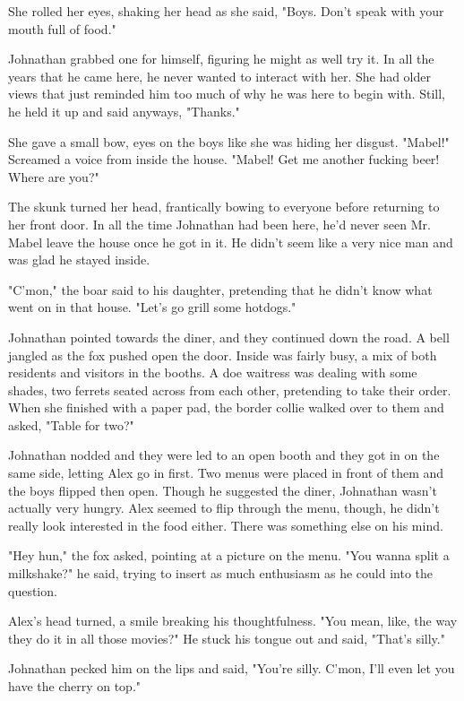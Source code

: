 She rolled her eyes, shaking her head as she said, "Boys. Don't speak with your mouth full of food."

Johnathan grabbed one for himself, figuring he might as well try it. In all the years that he came here, he never wanted to interact with her. She had older views that just reminded him too much of why he was here to begin with. Still, he held it up and said anyways, "Thanks."

She gave a small bow, eyes on the boys like she was hiding her disgust. "Mabel!" Screamed a voice from inside the house. "Mabel! Get me another fucking beer! Where are you?"

The skunk turned her head, frantically bowing to everyone before returning to her front door. In all the time Johnathan had been here, he'd never seen Mr. Mabel leave the house once he got in it. He didn't seem like a very nice man and was glad he stayed inside.

"C'mon," the boar said to his daughter, pretending that he didn't know what went on in that house. "Let's go grill some hotdogs."

Johnathan pointed towards the diner, and they continued down the road. A bell jangled as the fox pushed open the door. Inside was fairly busy, a mix of both residents and visitors in the booths. A doe waitress was dealing with some shades, two ferrets seated across from each other, pretending to take their order. When she finished with a paper pad, the border collie walked over to them and asked, "Table for two?"

Johnathan nodded and they were led to an open booth and they got in on the same side, letting Alex go in first. Two menus were placed in front of them and the boys flipped then open. Though he suggested the diner, Johnathan wasn't actually very hungry. Alex seemed to flip through the menu, though, he didn't really look interested in the food either. There was something else on his mind.

"Hey hun," the fox asked, pointing at a picture on the menu. "You wanna split a milkshake?" he said, trying to insert as much enthusiasm as he could into the question.

Alex's head turned, a smile breaking his thoughtfulness. "You mean, like, the way they do it in all those movies?" He stuck his tongue out and said, "That's silly."

Johnathan pecked him on the lips and said, "You're silly. C'mon, I'll even let you have the cherry on top."

